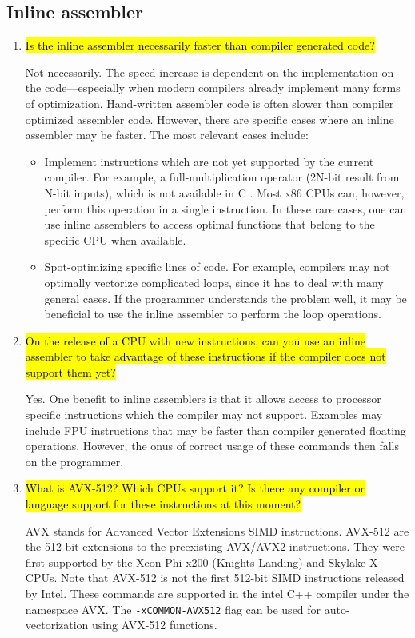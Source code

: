\documentclass{article}
\begin{document}
\subsection{Inline assembler}
\begin{enumerate}
	\item \hl{Is the inline assembler necessarily faster than compiler generated code?}

	Not necessarily. The speed increase is dependent on the implementation on the code---especially when modern compilers already implement many forms of optimization. Hand-written assembler code is often slower than compiler optimized assembler code. However, there are specific cases where an inline assembler may be faster. The most relevant cases include:
	\begin{itemize}
		\item Implement instructions which are not yet supported by the current compiler. For example, a full-multiplication operator (2N-bit result from N-bit inputs), which is not available in C . Most x86 CPUs can, however, perform this operation in a single instruction. In these rare cases, one can use inline assemblers to access optimal functions that belong to the specific CPU when available.

		\item Spot-optimizing specific lines of code. For example, compilers may not optimally vectorize complicated loops, since it has to deal with many general cases. If the programmer understands the problem well, it may be beneficial to use the inline assembler to perform the loop operations.
	\end{itemize}
	
	\item \hl{On the release of a CPU with new instructions, can you use an inline assembler to take advantage of these instructions if the compiler does not support them yet?}

	Yes. One benefit to inline assemblers is that it allows access to processor specific instructions which the compiler may not support. Examples may include FPU instructions that may be faster than compiler generated floating operations. However, the onus of correct usage of these commands then falls on the programmer.
	
	\item \hl{What is AVX-512? Which CPUs support it? Is there any compiler or language support for these instructions at this moment?}

	AVX stands for Advanced Vector Extensions SIMD instructions. AVX-512 are the 512-bit extensions to the preexisting AVX/AVX2 instructions. They were first supported by the Xeon-Phi x200 (Knights Landing) and Skylake-X CPUs. Note that AVX-512 is not the first 512-bit SIMD instructions released by Intel. These commands are supported in the intel C++ compiler under the namespace AVX. The \verb!-xCOMMON-AVX512! flag can be used for auto-vectorization using AVX-512 functions.
\end{enumerate}
\end{document}

